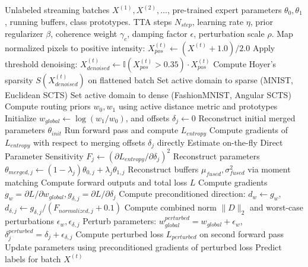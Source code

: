 \documentclass{article}
\theoremstyle{plain}
\theoremstyle{definition}
\theoremstyle{remark}
\begin{document}
\begin{algorithm*}[t]
\caption{BK-FWSAM: Test-Time Model Merging}
\label{alg:bkfwsam}
\begin{small}
\begin{algorithmic}[1]
   Unlabeled streaming batches $X^{(1)}, X^{(2)}, \dots$, pre-trained expert parameters $\theta_{0}, \theta_{1}$, running buffers, class prototypes.
   TTA steps $N_{step}$, learning rate $\eta$, prior regularizer $\beta$, coherence weight $\gamma_c$, damping factor $\epsilon$, perturbation scale $\rho$.
    \STATE Map normalized pixels to positive intensity: $X_{pos}^{(t)} \leftarrow (X^{(t)} + 1.0)/2.0$
    \STATE Apply threshold denoising: $X_{denoised}^{(t)} \leftarrow \mathbb{I}(X_{pos}^{(t)} > 0.35) \cdot X_{pos}^{(t)}$
    \STATE Compute Hoyer's sparsity $S(X_{denoised}^{(t)})$ on flattened batch
      \STATE Set active domain to sparse (MNIST, Euclidean SCTS)
    \ELSE
      \STATE Set active domain to dense (FashionMNIST, Angular SCTS)
    \ENDIF
    \STATE Compute routing priors $w_0, w_1$ using active distance metric and prototypes
    \STATE Initialize $w_{global} \leftarrow \log(w_1 / w_0)$, and offsets $\delta_j \leftarrow 0$
    \STATE Reconstruct initial merged parameters $\theta_{init}$
    \STATE Run forward pass and compute $L_{entropy}$
    \STATE Compute gradients of $L_{entropy}$ with respect to merging offsets $\delta_j$ directly
    \STATE Estimate on-the-fly Direct Parameter Sensitivity $F_j \leftarrow (\partial L_{entropy} / \partial \delta_j)^2$
      \STATE Reconstruct parameters $\theta_{merged, j} \leftarrow (1 - \lambda_j) \theta_{0, j} + \lambda_j \theta_{1, j}$
      \STATE Reconstruct buffers $\mu_{fused}, \sigma^2_{fused}$ via moment matching
      \STATE Compute forward outputs and total loss $L$
      \STATE Compute gradients $g_w = \partial L / \partial w_{global}, g_{\delta, j} = \partial L / \partial \delta_j$
      \STATE Compute preconditioned direction: $d_w \leftarrow g_w$, $d_{\delta, j} \leftarrow g_{\delta, j} / (F_{normalized, j} + 0.1)$
      \STATE Compute combined norm $\|D\|_2$ and worst-case perturbations $\epsilon_w, \epsilon_{\delta, j}$
      \STATE Perturb parameters: $w_{global}^{perturbed} = w_{global} + \epsilon_w$, $\delta_j^{perturbed} = \delta_j + \epsilon_{\delta, j}$
      \STATE Compute perturbed loss $L_{perturbed}$ on second forward pass
      \STATE Update parameters using preconditioned gradients of perturbed loss
    \ENDFOR
    \STATE Predict labels for batch $X^{(t)}$
  \ENDFOR
\end{algorithmic}
\end{small}
\end{algorithm*}
\end{document}

